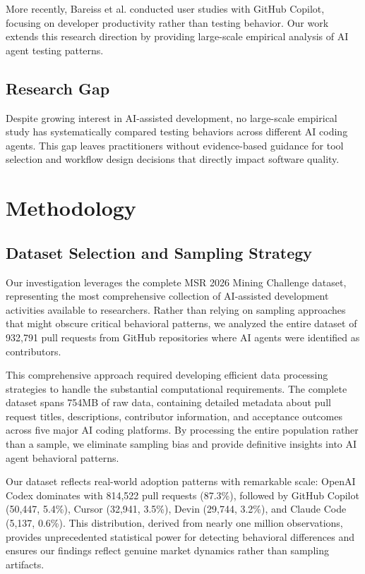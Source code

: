 \documentclass[conference]{IEEEtran}
\begin{document}
More recently, Bareiss et al. \cite{bareiss2023code} conducted user studies with GitHub Copilot, focusing on developer productivity rather than testing behavior. Our work extends this research direction by providing large-scale empirical analysis of AI agent testing patterns.

\subsection{Research Gap}

Despite growing interest in AI-assisted development, no large-scale empirical study has systematically compared testing behaviors across different AI coding agents. This gap leaves practitioners without evidence-based guidance for tool selection and workflow design decisions that directly impact software quality.

\section{Methodology}

\subsection{Dataset Selection and Sampling Strategy}

Our investigation leverages the complete MSR 2026 Mining Challenge dataset, representing the most comprehensive collection of AI-assisted development activities available to researchers. Rather than relying on sampling approaches that might obscure critical behavioral patterns, we analyzed the entire dataset of 932,791 pull requests from GitHub repositories where AI agents were identified as contributors.

This comprehensive approach required developing efficient data processing strategies to handle the substantial computational requirements. The complete dataset spans 754MB of raw data, containing detailed metadata about pull request titles, descriptions, contributor information, and acceptance outcomes across five major AI coding platforms. By processing the entire population rather than a sample, we eliminate sampling bias and provide definitive insights into AI agent behavioral patterns.

Our dataset reflects real-world adoption patterns with remarkable scale: OpenAI Codex dominates with 814,522 pull requests (87.3\%), followed by GitHub Copilot (50,447, 5.4\%), Cursor (32,941, 3.5\%), Devin (29,744, 3.2\%), and Claude Code (5,137, 0.6\%). This distribution, derived from nearly one million observations, provides unprecedented statistical power for detecting behavioral differences and ensures our findings reflect genuine market dynamics rather than sampling artifacts.
\end{document}
